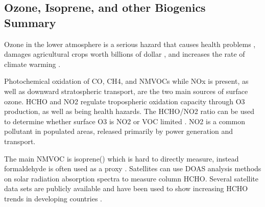 \subsection{Ozone, Isoprene, and other Biogenics Summary}
Ozone in the lower atmosphere is a serious hazard that causes health problems \cite{Hsieh_2013}, damages agricultural crops worth billions of dollar \cite{Avnery_2011}, and increases the rate of climate warming \cite{IPCC_2013_chap8}.
  
Photochemical oxidation of CO, CH4, and NMVOCs while NOx is present, as well as downward stratospheric transport, are the two main sources of surface ozone.
HCHO and NO2 regulate tropospheric oxidation capacity through O3 production, as well as being health hazards.
The HCHO/NO2 ratio can be used to determine whether surface O3 is NO2 or VOC limited \cite{Mahajan_2015}.
NO2 is a common pollutant in populated areas, released primarily by power generation and transport.


The main NMVOC is isoprene(\cite{Guenther_2006}) which is hard to directly measure, instead formaldehyde is often used as a proxy \cite{Marais_2012, bauwens2013satellite}. 
Satellites can use DOAS analysis methods on solar radiation absorption spectra to measure column HCHO.
Several satellite data sets are publicly available and have been used to show increasing HCHO trends in developing countries \cite{Mahajan_2015}.
  
  